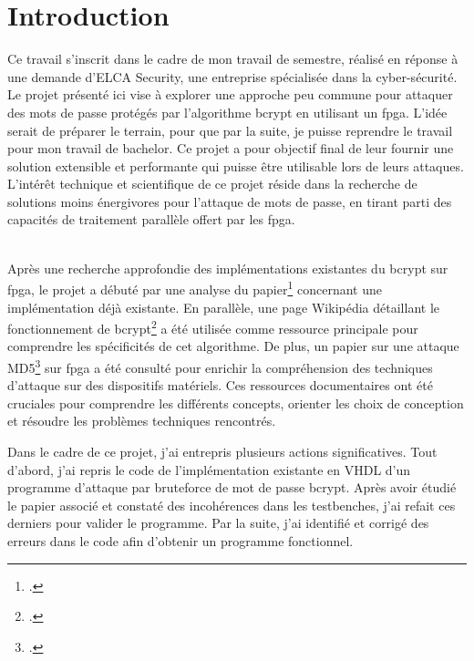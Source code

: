 \chapter*{Introduction}


Ce travail s'inscrit dans le cadre de mon travail de semestre, réalisé en réponse à une demande d'ELCA Security, une entreprise spécialisée dans la cyber-sécurité. 
Le projet présenté ici vise à explorer une approche peu commune pour attaquer des mots de passe protégés par l'algorithme bcrypt en utilisant un \gls{fpga}. 
L'idée serait de préparer le terrain, pour que par la suite, je puisse reprendre le travail pour mon travail de bachelor.
Ce projet a pour objectif final de leur fournir une solution extensible et performante qui puisse être utilisable lors de leurs attaques. 
L'intérêt technique et scientifique de ce projet réside dans la recherche de solutions moins énergivores pour l'attaque de mots de passe, en tirant parti des capacités de traitement parallèle offert par les \gls{fpga}.\\\


Après une recherche approfondie des implémentations existantes du bcrypt sur \gls{fpga}, le projet a débuté par une analyse du papier\footcite{wiemer_high-speed_2014} concernant une implémentation déjà existante. 
En parallèle, une page Wikipédia détaillant le fonctionnement de bcrypt\footcite{noauthor_bcrypt_2024} a été utilisée comme ressource principale pour comprendre les spécificités de cet algorithme. 
De plus, un papier sur une attaque MD5\footcite{gillela_parallelization_2019} sur \gls{fpga} a été consulté pour enrichir la compréhension des techniques d'attaque sur des dispositifs matériels. 
Ces ressources documentaires ont été cruciales pour comprendre les différents concepts, orienter les choix de conception et résoudre les problèmes techniques rencontrés.

Dans le cadre de ce projet, j'ai entrepris plusieurs actions significatives. 
Tout d'abord, j'ai repris le code de l'implémentation existante en VHDL d'un programme d'attaque par bruteforce de mot de passe bcrypt. 
Après avoir étudié le papier associé et constaté des incohérences dans les testbenches, j'ai refait ces derniers pour valider le programme. 
Par la suite, j'ai identifié et corrigé des erreurs dans le code afin d'obtenir un programme fonctionnel.

